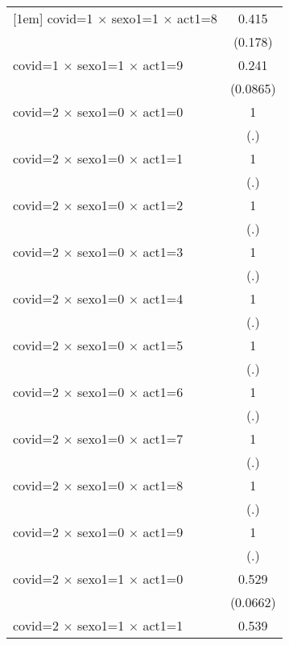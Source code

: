 {\begin{tabular}{l*{1}{c}}
[1em]
covid=1 $\times$ sexo1=1 $\times$ act1=8&       0.415\sym{*}  \\
                    &     (0.178)         \\
[1em]
covid=1 $\times$ sexo1=1 $\times$ act1=9&       0.241\sym{***}\\
                    &    (0.0865)         \\
[1em]
covid=2 $\times$ sexo1=0 $\times$ act1=0&           1         \\
                    &         (.)         \\
[1em]
covid=2 $\times$ sexo1=0 $\times$ act1=1&           1         \\
                    &         (.)         \\
[1em]
covid=2 $\times$ sexo1=0 $\times$ act1=2&           1         \\
                    &         (.)         \\
[1em]
covid=2 $\times$ sexo1=0 $\times$ act1=3&           1         \\
                    &         (.)         \\
[1em]
covid=2 $\times$ sexo1=0 $\times$ act1=4&           1         \\
                    &         (.)         \\
[1em]
covid=2 $\times$ sexo1=0 $\times$ act1=5&           1         \\
                    &         (.)         \\
[1em]
covid=2 $\times$ sexo1=0 $\times$ act1=6&           1         \\
                    &         (.)         \\
[1em]
covid=2 $\times$ sexo1=0 $\times$ act1=7&           1         \\
                    &         (.)         \\
[1em]
covid=2 $\times$ sexo1=0 $\times$ act1=8&           1         \\
                    &         (.)         \\
[1em]
covid=2 $\times$ sexo1=0 $\times$ act1=9&           1         \\
                    &         (.)         \\
[1em]
covid=2 $\times$ sexo1=1 $\times$ act1=0&       0.529\sym{***}\\
                    &    (0.0662)         \\
[1em]
covid=2 $\times$ sexo1=1 $\times$ act1=1&       0.539         \\

\end{tabular}}
